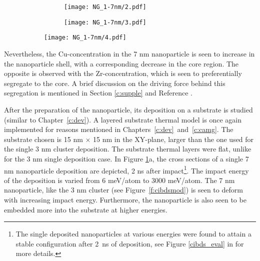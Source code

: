 \begin{figure}[!h]
	\begin{subfigure}{0.55\textwidth} \centering
		\begin{subfigure}{\textwidth} \centering
			\texttt{[image: NG\_1-7nm/2.pdf]}
		\end{subfigure}%
		\vfill
		\begin{subfigure}{\textwidth} \centering
			\texttt{[image: NG\_1-7nm/3.pdf]}
		\end{subfigure}
	\end{subfigure}%
	\hspace{0.3cm}
	\begin{subfigure}{0.45\textwidth} \centering
		\texttt{[image: NG\_1-7nm/4.pdf]}
	\end{subfigure}%
	\label{f:7nm-cibds}
\end{figure}

Nevertheless, the Cu-concentration in the 7 nm nanoparticle is seen to increase in the nanoparticle shell, with a corresponding decrease in the core region. The opposite is observed with the Zr-concentration, which is seen to preferentially segregate to the core. A brief discussion on the driving force behind this segregation is mentioned in Section \ref{c:supple} and Reference \cite{Adjaoud2016}. \par

After the preparation of the nanoparticle, its deposition on a substrate is studied (similar to Chapter~\ref{c:dev}). A layered substrate thermal model is once again implemented for reasons mentioned in Chapters~\ref{c:dev}~and~\ref{c:camg}. The substrate chosen is 15 nm $\times$ 15 nm in the XY-plane, larger than the one used for the single 3 nm cluster deposition. The substrate thermal layers were flat, unlike for the 3 nm single deposition case. In Figure \ref{f:7nm-cibds}a, the cross sections of a single 7 nm nanoparticle deposition are depicted, 2 ns after impact\footnote{The single deposited nanoparticles at various energies were found to attain a stable configuration after \mbox{2 ns} of deposition, see Figure \ref{cibds_eval} in  for more details.}. The impact energy of the deposition is varied from 6 meV/atom to 3000 meV/atom. The 7 nm nanoparticle, like the 3 nm cluster (see Figure~\ref{f:cibdsmod}) is seen to deform with increasing impact energy. Furthermore, the nanoparticle is also seen to be embedded more into the substrate at higher energies. \par

